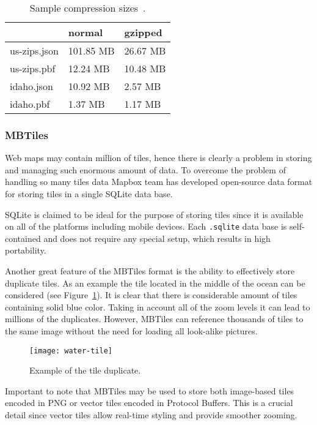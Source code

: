 \begin{table}[ht]
  \renewcommand{\arraystretch}{1.5}
  \centering
  \begin{tabular}{l l l}
    \hline
    & \textbf{normal} & \textbf{gzipped} \\
    \hline
    us-zips.json & 101.85 MB & 26.67 MB \\
    us-zips.pbf & 12.24 MB & 10.48 MB \\
    idaho.json & 10.92 MB & 2.57 MB \\
    idaho.pbf & 1.37 MB & 1.17 MB \\
    \hline
  \end{tabular}

  \caption{Sample compression sizes~\cite{geobuf}.}
  \label{tab:geobuf}
\end{table}

\subsubsection{MBTiles}

Web maps may contain million of tiles, hence there is clearly a problem in storing and managing such
enormous amount of data. To overcome the problem of handling so many tiles data Mapbox team has
developed open-source data format for storing tiles in a single SQLite data base.

SQLite is claimed to be ideal for the purpose of storing tiles since it is available on all of the
platforms including mobile devices. Each \texttt{.sqlite} data base is self-contained and does not
require any special setup, which results in high portability.

Another great feature of the MBTiles format is the ability to effectively store duplicate tiles. As
an example the tile located in the middle of the ocean can be considered (see
Figure~\ref{pic:water-tile}). It is clear that there is considerable amount of tiles containing
solid blue color. Taking in account all of the zoom levels it can lead to millions of the
duplicates. However, MBTiles can reference thousands of tiles to the same image without
the need for loading all look-alike pictures.

\begin{figure}[ht]
  {\par\centering
  \texttt{[image: water-tile]}
  \par}
  \caption{Example of the tile duplicate.}
  \label{pic:water-tile}
\end{figure}

Important to note that MBTiles may be used to store both image-based tiles encoded in PNG or
vector tiles encoded in Protocol Buffers. This is a crucial detail since vector tiles
allow real-time styling and provide smoother zooming.







